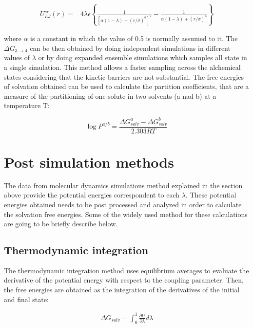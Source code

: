 \begin{equation}
\label{eq:softcoreLJ}
\begin{aligned}
U_{LJ}^{sc}(r) {}=& 4\lambda\epsilon \left\lbrace\frac{1}{\left[\alpha(1-\lambda)+ (r/\sigma)^{6}\right]^{2}} - \frac{1}{\alpha(1-\lambda)+(r/\sigma)^{6}}\right\rbrace
\end{aligned}
\end{equation}

where $\alpha$ is a constant in which the value of 0.5 is normally assumed to it. The $\Delta G_{3 \rightarrow 4}$ can be then obtained by doing independent simulations in different values of $\lambda$ or by doing expanded ensemble simulations \cite{lyubartsev} which samples all state in a single simulation. This method allows a faster sampling across the alchemical states considering that the kinetic barriers are not substantial. The free energies of solvation obtained can be used to calculate the partition coefficients, that are a measure of the partitioning of one solute in two solvents (a nad b) at a temperature T:

\begin{equation}
\label{eqn:partcoe}
\log{P}^{a/b} = \frac{\Delta G_{solv}^{a} - \Delta G_{solv}^{b}}{2.303RT}
\end{equation}

\section{Post simulation methods}

The data from molecular dynamics simulations method explained in the section above provide the potential energies correspondent to each $\lambda$. These potential energies obtained needs to be post processed and analyzed in order to calculate the solvation free energies. Some of the widely used method for these calculations are going to be briefly describe below. 

\subsection{Thermodynamic integration}

The thermodynamic integration method \cite{kirkwood1935} uses equilibrium averages to evaluate the derivative of the potential energy with respect to the coupling parameter. Then, the free energies are obtained as the integration of the derivatives of the initial and final state:

\begin{equation}
\label{eq:ti}
\begin{aligned}
\Delta G_{solv} = \int_{0}^{1} \frac{\partial U}{\partial \lambda} d\lambda
\end{aligned}
\end{equation}

